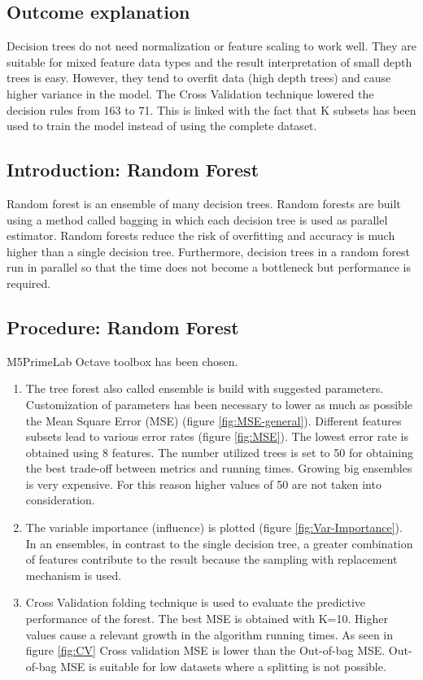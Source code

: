 \documentclass{article}
\begin{document}
\vfill
\clearpage

\subsection{Outcome explanation}
Decision trees do not need normalization or feature scaling to work well. They are suitable for mixed feature data types and the result interpretation of small depth trees is easy. However, they tend to overfit data (high depth trees) and cause higher variance in the model. The Cross Validation technique lowered the decision rules from 163 to 71. This is linked with the fact that K subsets has been used to train the model instead of using the complete dataset.

\subsection{Introduction: Random Forest}
Random forest is an ensemble of many decision trees. Random forests are built using a method called bagging in which each decision tree is used as parallel estimator.
Random forests reduce the risk of overfitting and accuracy is much higher than a single decision tree. Furthermore, decision trees in a random forest run in parallel so that the time does not become a bottleneck but performance is required.

\subsection{Procedure: Random Forest}
M5PrimeLab Octave toolbox has been chosen.
\begin{enumerate}  
	\item The tree forest also called ensemble is build with suggested parameters. Customization of parameters has been necessary to lower as much as possible the Mean Square Error (MSE) (figure \ref{fig:MSE-general}). Different features subsets lead to various error rates (figure \ref{fig:MSE}). The lowest error rate is obtained using 8 features. The number utilized trees is set to 50 for obtaining the best trade-off between metrics and running times. Growing big ensembles is very expensive. For this reason higher values of 50 are not taken into consideration. 
	\item The variable importance (influence) is plotted (figure \ref{fig:Var-Importance}). In an ensembles, in contrast to the single decision tree, a greater combination of features contribute to the result because the sampling with replacement mechanism is used.
	\item Cross Validation folding technique is used to evaluate the predictive performance of the forest. The best MSE is obtained with K=10. Higher values cause a relevant growth in the algorithm running times. As seen in figure \ref{fig:CV} Cross validation MSE is lower than the Out-of-bag MSE. Out-of-bag MSE is suitable for low datasets where a splitting is not possible.
\end{enumerate}
\end{document}
